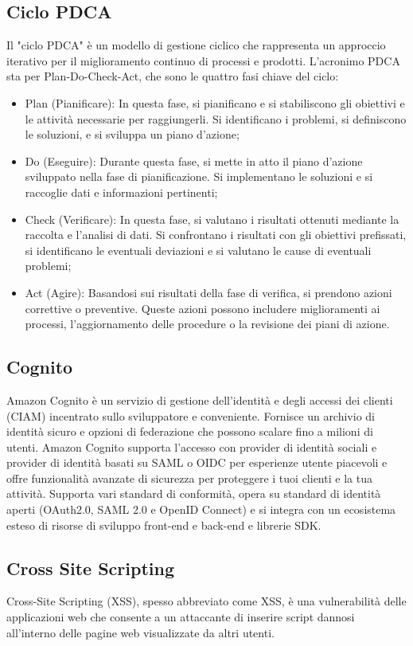 \documentclass{article}
\begin{document}
\subsection{Ciclo PDCA}
 Il "ciclo PDCA" è un modello di gestione ciclico che rappresenta un approccio iterativo per il miglioramento continuo di processi e prodotti. L'acronimo PDCA sta per Plan-Do-Check-Act, che sono le quattro fasi chiave del ciclo:
\begin{itemize}
    \item Plan (Pianificare): In questa fase, si pianificano e si stabiliscono gli obiettivi e le attività necessarie per raggiungerli. Si identificano i problemi, si definiscono le soluzioni, e si sviluppa un piano d'azione;
    \item Do (Eseguire): Durante questa fase, si mette in atto il piano d'azione sviluppato nella fase di pianificazione. Si implementano le soluzioni e si raccoglie dati e informazioni pertinenti;
    \item Check (Verificare): In questa fase, si valutano i risultati ottenuti mediante la raccolta e l'analisi di dati. Si confrontano i risultati con gli obiettivi prefissati, si identificano le eventuali deviazioni e si valutano le cause di eventuali problemi;
    \item Act (Agire): Basandosi sui risultati della fase di verifica, si prendono azioni correttive o preventive. Queste azioni possono includere miglioramenti ai processi, l'aggiornamento delle procedure o la revisione dei piani di azione.
\end{itemize}

\subsection{Cognito}
Amazon Cognito è un servizio di gestione dell'identità e degli accessi dei clienti (CIAM) incentrato sullo sviluppatore e conveniente. Fornisce un archivio di identità sicuro e opzioni di federazione che possono scalare fino a milioni di utenti. Amazon Cognito supporta l'accesso con provider di identità sociali e provider di identità basati su SAML o OIDC per esperienze utente piacevoli e offre funzionalità avanzate di sicurezza per proteggere i tuoi clienti e la tua attività. Supporta vari standard di conformità, opera su standard di identità aperti (OAuth2.0, SAML 2.0 e OpenID Connect) e si integra con un ecosistema esteso di risorse di sviluppo front-end e back-end e librerie SDK.

\subsection{Cross Site Scripting}
Cross-Site Scripting (XSS), spesso abbreviato come XSS, è una vulnerabilità delle applicazioni web che consente a un attaccante di inserire script dannosi all'interno delle pagine web visualizzate da altri utenti.
\end{document}
